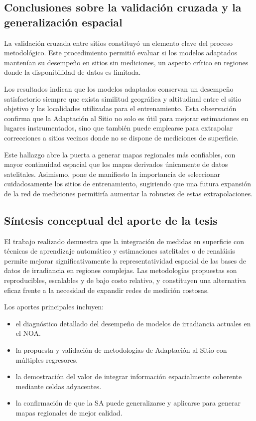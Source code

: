 \subsection{Conclusiones sobre la validación cruzada y la generalización espacial}

La validación cruzada entre sitios constituyó un elemento clave del proceso metodológico. Este procedimiento permitió evaluar si los modelos adaptados mantenían su desempeño en sitios sin mediciones, un aspecto crítico en regiones donde la disponibilidad de datos es limitada.

Los resultados indican que los modelos adaptados conservan un desempeño satisfactorio siempre que exista similitud geográfica y altitudinal entre el sitio objetivo y las localidades utilizadas para el entrenamiento. Esta observación confirma que la Adaptación al Sitio no solo es útil para mejorar estimaciones en lugares instrumentados, sino que también puede emplearse para extrapolar correcciones a sitios vecinos donde no se dispone de mediciones de superficie.

Este hallazgo abre la puerta a generar mapas regionales más confiables, con mayor continuidad espacial que los mapas derivados únicamente de datos satelitales. Asimismo, pone de manifiesto la importancia de seleccionar cuidadosamente los sitios de entrenamiento, sugiriendo que una futura expansión de la red de mediciones permitiría aumentar la robustez de estas extrapolaciones.


\subsection{Síntesis conceptual del aporte de la tesis}

El trabajo realizado demuestra que la integración de medidas en superficie con técnicas de aprendizaje automático y estimaciones satelitales o de renaláisis permite mejorar significativamente la representatividad espacial de las bases de datos de irradiancia en regiones complejas. Las metodologías propuestas son reproducibles, escalables y de bajo costo relativo, y constituyen una alternativa eficaz frente a la necesidad de expandir redes de medición costosas.

Los aportes principales incluyen:

\begin{itemize}
\item el diagnóstico detallado del desempeño de modelos de irradiancia actuales en el NOA.
\item la propuesta y validación de metodologías de Adaptación al Sitio con múltiples regresores.
\item la demostración del valor de integrar información espacialmente coherente mediante celdas adyacentes.
\item la confirmación de que la SA puede generalizarse y aplicarse para generar mapas regionales de mejor calidad.
\end{itemize}


